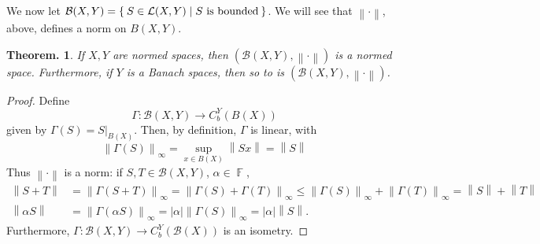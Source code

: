 \documentclass[11pt, a4paper]{memoir}
\DeclareMathOperator{\F}{{\mathbb{F}}}
\newcommand{\norm}[1]{\ensuremath{\left\lVert#1\right\rVert}}
\theoremstyle{change}
\newtheorem{theorem}{Theorem.}[section]
\theoremstyle{plain}
\theoremstyle{nonumberplain}
\newtheorem{proof}{Proof}
\numberwithin{equation}{section}
\begin{document}
We now let $\mathcal{B}(X,Y)=\Set{S\in\mathcal{L}(X,Y) | S\text{ is bounded}}$.
We will see that $\norm{\cdot}$, above, defines a norm on $B(X,Y)$.
\begin{theorem}
    If $X,Y$ are normed spaces, then $(\mathcal{B}(X,Y),\norm{\cdot})$ is a normed space.
    Furthermore, if $Y$ is a Banach spaces, then so to is $(\mathcal{B}(X,Y),\norm{\cdot})$.
\end{theorem}
\begin{proof}
    Define
    \begin{equation*}
        \Gamma:\mathcal{B}(X,Y)\to C_b^Y(B(X))
    \end{equation*}
    given by $\Gamma(S)=S|_{B(X)}$.
    Then, by definition, $\Gamma$ is linear, with
    \begin{equation*}
        \norm{\Gamma(S)}_\infty=\sup_{x\in B(X)}\norm{Sx}=\norm{S}
    \end{equation*}
    Thus $\norm{\cdot}$ is a norm: if $S,T\in\mathcal{B}(X,Y)$, $\alpha\in\F$,
    \begin{align*}
        \norm{S+T}&=\norm{\Gamma(S+T)}_\infty=\norm{\Gamma(S)+\Gamma(T)}_\infty\leq \norm{\Gamma(S)}_\infty+\norm{\Gamma(T)}_\infty=\norm{S}+\norm{T}\\
        \norm{\alpha S}&=\norm{\Gamma(\alpha S)}_\infty=|\alpha|\norm{\Gamma(S)}_\infty=|\alpha|\norm{S}.
    \end{align*}
    Furthermore, $\Gamma:\mathcal{B}(X,Y)\to C_b^Y(\mathcal{B}(X))$ is an isometry.


\end{proof}
\end{document}
